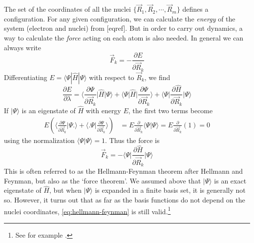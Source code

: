 \documentclass[11pt,bibliography=totoc,index=totoc]{scrbook}   %
\begin{document}
The set of the coordinates of all the nuclei $\{\vec{R}_1,\vec{R}_2,\cdots,\vec{R}_m\}$ defines a configuration. 
For any given configuration, we can calculate the \emph{energy} of the system (electron and nuclei) from [eqref].
But in order to carry out dynamics, a way to calculate the \emph{force} acting on each atom is also needed. 
In general we can always write
\begin{equation}
  \vec{F}_k = -\frac{\partial E}{\partial\vec{R}_k}
\end{equation}
Differentiating $E=\langle\Psi|\hat{H}|\Psi\rangle$ with respect to $\vec{R}_k$, we find
\begin{equation}
  \frac{\partial E}{\partial\lambda} 
  = \biggl\langle \frac{\partial\Psi}{\partial\vec{R}_k} \biggl| \hat{H} \biggr| \Psi \biggr\rangle
  + \biggl\langle \Psi \biggl| \hat{H} \biggr| \frac{\partial\Psi}{\partial\vec{R}_k} \biggr\rangle
  + \biggl\langle \Psi \biggl| \frac{\partial\hat{H}}{\partial\vec{R}_k} \biggr| \Psi \biggr\rangle
\end{equation}
If $|\Psi\rangle$ is an eigenstate of $\hat{H}$ with energy $E$, the first two terms become
\begin{align}
  E \left (\biggl\langle \frac{\partial\Psi}{\partial\vec{R}_k} \biggl| \Psi \biggr. \biggr\rangle
  + \biggl\langle\biggl. \Psi \biggr| \frac{\partial\Psi}{\partial\vec{R}_k} \biggr\rangle \right) 
  &= E \frac{\partial}{\partial\vec{R}_k} \langle \Psi | \Psi \rangle 
  = E \frac{\partial}{\partial\vec{R}_k} (1) = 0
\end{align}
using the normalization $\langle\Psi|\Psi\rangle=1$. Thus the force is
\begin{equation}
  \vec{F}_k = - \biggl\langle \Psi \biggl| \frac{\partial\hat{H}}{\partial\vec{R}_k} \biggr| \Psi \biggr\rangle
  \label{eq:hellmann-feynman}
\end{equation}
This is often referred to as the Hellmann-Feynman theorem after Hellmann\cite{Hellmann:1937} 
and Feynman\cite{Feynman:1939}, but also as the `force theorem'\cite[56]{Martin:2004}. 
We assumed above that $|\Psi\rangle$ is an exact eigenstate of $\hat{H}$, but when $|\Psi\rangle$ is expanded in a finite basis set, it is generally not so.
However, it turns out that as far as the basis functions do not depend on the nuclei coordinates, \eqref{eq:hellmann-feynman} is still valid.\footnote{See for example \cite[557]{Kantorovich:2004}.}
\end{document}
